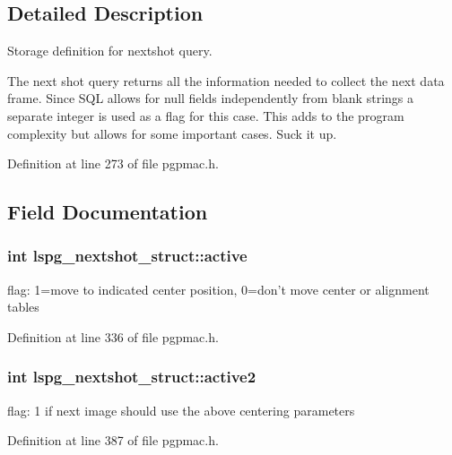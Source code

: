 \subsection{Detailed Description}
Storage definition for nextshot query. 

The next shot query returns all the information needed to collect the next data frame. Since S\-Q\-L allows for null fields independently from blank strings a separate integer is used as a flag for this case. This adds to the program complexity but allows for some important cases. Suck it up. 

Definition at line 273 of file pgpmac.\-h.



\subsection{Field Documentation}
\hypertarget{structlspg__nextshot__struct_a1a94eefbad713976a3d9213695a6ca28}{
\subsubsection[{active}]{\setlength{\rightskip}{0pt plus 5cm}int lspg\-\_\-nextshot\-\_\-struct\-::active}}\label{structlspg__nextshot__struct_a1a94eefbad713976a3d9213695a6ca28}


flag\-: 1=move to indicated center position, 0=don't move center or alignment tables 



Definition at line 336 of file pgpmac.\-h.

\hypertarget{structlspg__nextshot__struct_a2875aa18df587806a3d8c05220fd62b5}{
\subsubsection[{active2}]{\setlength{\rightskip}{0pt plus 5cm}int lspg\-\_\-nextshot\-\_\-struct\-::active2}}\label{structlspg__nextshot__struct_a2875aa18df587806a3d8c05220fd62b5}


flag\-: 1 if next image should use the above centering parameters 



Definition at line 387 of file pgpmac.\-h.


